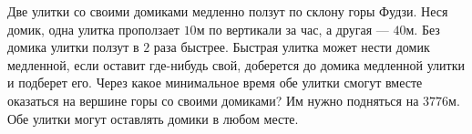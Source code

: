 Две улитки со своими домиками медленно ползут по склону горы Фудзи. Неся домик, одна улитка проползает $10 \unit{м}$ по вертикали за час, а другая --- $40 \unit{м}$. Без домика улитки ползут в $2$ раза быстрее. Быстрая улитка может нести домик медленной, если оставит где-нибудь свой, доберется до домика медленной улитки и подберет его. Через какое минимальное время обе улитки смогут вместе оказаться на вершине горы со своими домиками? Им нужно подняться на $3776\unit{м}$. \\
Обе улитки могут оставлять домики в любом месте.